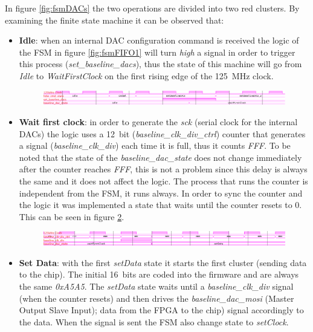 In figure \ref{fig:fsmDACs} the two operations are divided into two red clusters.
By examining the finite state machine it can be observed that:
\begin{itemize}
	\item \textbf{Idle}: when an internal DAC configuration command is received the logic of the FSM in figure \ref{fig:fsmFIFO1} will turn \textit{high} a signal in order to trigger this process (\textit{set\_baseline\_dacs}), thus the state of this machine will go from \textit{Idle} to \textit{WaitFirstClock} on the first rising edge of the 125~MHz clock.
	\begin{figure}[H]
		\centering
		\includegraphics[width=1.0\linewidth]{IMG/ch4/DACsimulations/FSMiddle}
		\caption{}
		\label{fig:fsmiddle}
	\end{figure} 
	\item \textbf{Wait first clock}: in order to generate the \textit{sck} (serial clock for the internal DACs) the logic uses a 12~bit (\textit{baseline\_clk\_div\_ctrl}) counter that generates a signal (\textit{baseline\_clk\_div}) each time it is full, thus it counts \textit{FFF}.
	\newline To be noted that the state of the \textit{baseline\_dac\_state} does not change immediately after the counter reaches \textit{FFF}, this is not a problem since this delay is always the same and it does not affect the logic.
	\newline The process that runs the counter is independent from the FSM, it runs always. In order to sync the counter and the logic it was implemented a state that waits until the counter resets to 0. This can be seen in figure \ref{fig:fsmwaitfirstclock}. 
	\begin{figure}[H]
		\centering
		\includegraphics[width=1.0\linewidth]{IMG/ch4/DACsimulations/FSMwaitfirstclock}
		\caption{}
		\label{fig:fsmwaitfirstclock}
	\end{figure}
	\item \textbf{Set Data}: with the first \textit{setData} state it starts the first cluster (sending data to the chip). The initial 16~bits are coded into the firmware and are always the same \textit{0xA5A5}.
	The \textit{setData} state waits until a \textit{baseline\_clk\_div} signal (when the counter resets) and then drives the \textit{baseline\_dac\_mosi} (Master Output Slave Input); data from the FPGA to the chip) signal accordingly to the data. When the signal is sent the FSM also change state to \textit{setClock}.

\end{itemize}
